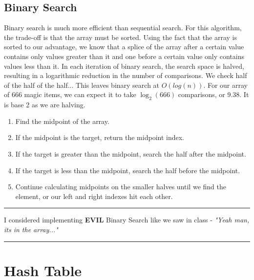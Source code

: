 \documentclass[letterpaper, 10pt]{article}
\begin{document}
\subsection{Binary Search}
Binary search is much more efficient than sequential search. For this algorithm, the trade-off is that the array must be sorted. Using the fact that the array is sorted to our advantage, we know that a splice of the array after a certain value contains only values greater than it and one before a certain value only contains values less than it. In each iteration of binary search, the search space is halved, resulting in a logarithmic reduction in the number of comparisons. We check half of the half of the half... This leaves binary search at $O(log(n))$. For our array of 666 magic items, we can expect it to take $\log_2(666)$ comparisons, or 9.38. It is base 2 as we are halving.
\begin{enumerate}
    \item Find the midpoint of the array.
    \item If the midpoint is the target, return the midpoint index.
    \item If the target is greater than the midpoint, search the half after the midpoint.
    \item If the target is less than the midpoint, search the half before the midpoint.
    \item Continue calculating midpoints on the smaller halves until we find the element, or our left and right indexes hit each other.
\end{enumerate}


\hrule
\vspace{.25cm}
I considered implementing \textbf{EVIL} Binary Search like we saw in class - \textit{"Yeah man, its in the array..."}\\
\hrule
\vspace{.25cm}

\section{Hash Table}
\end{document}
